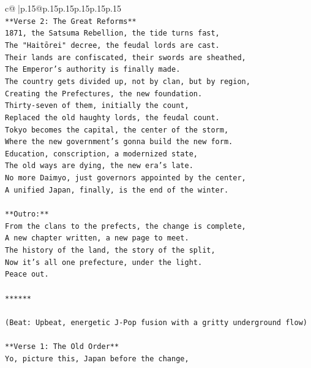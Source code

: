 \documentclass{article}
\begin{document}
{\begin{supertabular}{c@{$\;$}|p{.15\linewidth}@{}p{.15\linewidth}p{.15\linewidth}p{.15\linewidth}p{.15\linewidth}p{.15\linewidth}}
{{{\\ 
\texttt{**Verse 2: The Great Reforms**} \\
\texttt{1871, the Satsuma Rebellion, the tide turns fast,} \\
\texttt{The "Haitōrei" decree, the feudal lords are cast.} \\
\texttt{Their lands are confiscated, their swords are sheathed,} \\
\texttt{The Emperor's authority is finally made.} \\
\texttt{The country gets divided up, not by clan, but by region,} \\
\texttt{Creating the Prefectures, the new foundation.} \\
\texttt{Thirty{-}seven of them, initially the count,} \\
\texttt{Replaced the old haughty lords, the feudal count.} \\
\texttt{Tokyo becomes the capital, the center of the storm,} \\
\texttt{Where the new government's gonna build the new form.} \\
\texttt{Education, conscription, a modernized state,} \\
\texttt{The old ways are dying, the new era's late.} \\
\texttt{No more Daimyo, just governors appointed by the center,} \\
\texttt{A unified Japan, finally, is the end of the winter.} \\
\\ 
\texttt{**Outro:**} \\
\texttt{From the clans to the prefects, the change is complete,} \\
\texttt{A new chapter written, a new page to meet.} \\
\texttt{The history of the land, the story of the split,} \\
\texttt{Now it's all one prefecture, under the light.} \\
\texttt{Peace out.} \\
\\ 
\texttt{******} \\
\\ 
\texttt{(Beat: Upbeat, energetic J{-}Pop fusion with a gritty underground flow)} \\
\\ 
\texttt{**Verse 1: The Old Order**} \\
\texttt{Yo, picture this, Japan before the change,} \\
}}}
\end{supertabular}}
\end{document}
